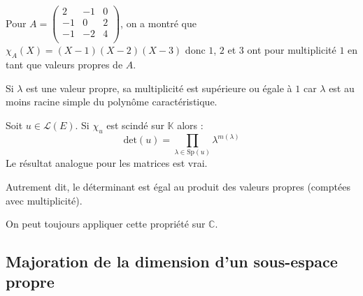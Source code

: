 \documentclass[french,11pt,twoside]{VcCours}
\begin{document}
\begin{Exemple}{} Pour $A = \begin{pmatrix}
2 & -1 & 0 \\
-1 & 0 & 2 \\
-1 & -2 & 4 \\
\end{pmatrix}$, on a montré que $\chi_A(X) = (X-1)(X-2)(X-3)$ donc $1$, $2$ et $3$ ont pour multiplicité $1$ en tant que valeurs propres de $A$.
\end{Exemple}


\begin{Remarque}{} Si $\lambda$ est une valeur propre, sa multiplicité est supérieure ou égale à $1$ car $\lambda$ est au moins racine simple du polynôme caractéristique.
\end{Remarque}


\begin{Proposition}{} Soit $u \in \mathcal{L}(E)$. Si $\chi_u$ est scindé sur $\mathbb{K}$ alors :
$$ \textrm{det}(u) = \prod_{\lambda \in \textrm{Sp}(u)} \lambda^{m(\lambda)} $$
Le résultat analogue pour les matrices est vrai.
\end{Proposition}

Autrement dit, le déterminant est égal au produit des valeurs propres (comptées avec multiplicité).


\begin{Demonstration}{} 

\vspace{3cm}
\end{Demonstration}

\begin{Remarque}{} On peut toujours appliquer cette propriété sur $\mathbb{C}$.
\end{Remarque}


\subsection{Majoration de la dimension d'un sous-espace propre}
\end{document}
